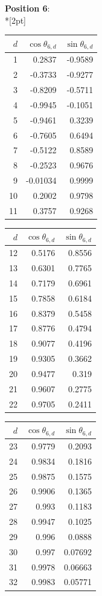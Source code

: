 \noindent \textbf{Position 6}:\\*[2pt]
{\tablefont \begin{tabular}[t]{r|rr}
$d$ & $\cos\theta_{6,d}$ & $\sin\theta_{6,d}$ \\\hline
1 & 0.2837 & -0.9589 \\
2 & -0.3733 & -0.9277 \\
3 & -0.8209 & -0.5711 \\
4 & -0.9945 & -0.1051 \\
5 & -0.9461 & 0.3239 \\
6 & -0.7605 & 0.6494 \\
7 & -0.5122 & 0.8589 \\
8 & -0.2523 & 0.9676 \\
9 & -0.01034 & 0.9999 \\
10 & 0.2002 & 0.9798 \\
11 & 0.3757 & 0.9268
\end{tabular}\kern4pt
\begin{tabular}[t]{r|rr}
$d$ & $\cos\theta_{6,d}$ & $\sin\theta_{6,d}$ \\\hline
12 & 0.5176 & 0.8556 \\
13 & 0.6301 & 0.7765 \\
14 & 0.7179 & 0.6961 \\
15 & 0.7858 & 0.6184 \\
16 & 0.8379 & 0.5458 \\
17 & 0.8776 & 0.4794 \\
18 & 0.9077 & 0.4196 \\
19 & 0.9305 & 0.3662 \\
20 & 0.9477 & 0.319 \\
21 & 0.9607 & 0.2775 \\
22 & 0.9705 & 0.2411
\end{tabular}\kern4pt
\begin{tabular}[t]{r|rr}
$d$ & $\cos\theta_{6,d}$ & $\sin\theta_{6,d}$ \\\hline
23 & 0.9779 & 0.2093 \\
24 & 0.9834 & 0.1816 \\
25 & 0.9875 & 0.1575 \\
26 & 0.9906 & 0.1365 \\
27 & 0.993 & 0.1183 \\
28 & 0.9947 & 0.1025 \\
29 & 0.996 & 0.0888 \\
30 & 0.997 & 0.07692 \\
31 & 0.9978 & 0.06663 \\
32 & 0.9983 & 0.05771 \\

\end{tabular}}
